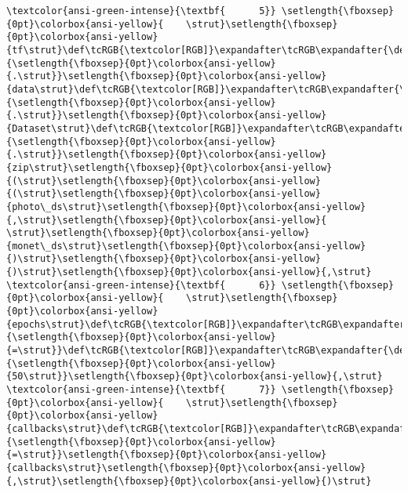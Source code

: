 \documentclass[11pt]{article}
\begin{document}
\begin{Verbatim}[commandchars=\\\{\}, frame=single, framerule=2mm, rulecolor=\color{outerrorbackground}]
\textcolor{ansi-green-intense}{\textbf{      5}} \setlength{\fboxsep}{0pt}\colorbox{ansi-yellow}{    \strut}\setlength{\fboxsep}{0pt}\colorbox{ansi-yellow}{tf\strut}\def\tcRGB{\textcolor[RGB]}\expandafter\tcRGB\expandafter{\detokenize{98,98,98}}{\setlength{\fboxsep}{0pt}\colorbox{ansi-yellow}{.\strut}}\setlength{\fboxsep}{0pt}\colorbox{ansi-yellow}{data\strut}\def\tcRGB{\textcolor[RGB]}\expandafter\tcRGB\expandafter{\detokenize{98,98,98}}{\setlength{\fboxsep}{0pt}\colorbox{ansi-yellow}{.\strut}}\setlength{\fboxsep}{0pt}\colorbox{ansi-yellow}{Dataset\strut}\def\tcRGB{\textcolor[RGB]}\expandafter\tcRGB\expandafter{\detokenize{98,98,98}}{\setlength{\fboxsep}{0pt}\colorbox{ansi-yellow}{.\strut}}\setlength{\fboxsep}{0pt}\colorbox{ansi-yellow}{zip\strut}\setlength{\fboxsep}{0pt}\colorbox{ansi-yellow}{(\strut}\setlength{\fboxsep}{0pt}\colorbox{ansi-yellow}{(\strut}\setlength{\fboxsep}{0pt}\colorbox{ansi-yellow}{photo\_ds\strut}\setlength{\fboxsep}{0pt}\colorbox{ansi-yellow}{,\strut}\setlength{\fboxsep}{0pt}\colorbox{ansi-yellow}{ \strut}\setlength{\fboxsep}{0pt}\colorbox{ansi-yellow}{monet\_ds\strut}\setlength{\fboxsep}{0pt}\colorbox{ansi-yellow}{)\strut}\setlength{\fboxsep}{0pt}\colorbox{ansi-yellow}{)\strut}\setlength{\fboxsep}{0pt}\colorbox{ansi-yellow}{,\strut}
\textcolor{ansi-green-intense}{\textbf{      6}} \setlength{\fboxsep}{0pt}\colorbox{ansi-yellow}{    \strut}\setlength{\fboxsep}{0pt}\colorbox{ansi-yellow}{epochs\strut}\def\tcRGB{\textcolor[RGB]}\expandafter\tcRGB\expandafter{\detokenize{98,98,98}}{\setlength{\fboxsep}{0pt}\colorbox{ansi-yellow}{=\strut}}\def\tcRGB{\textcolor[RGB]}\expandafter\tcRGB\expandafter{\detokenize{98,98,98}}{\setlength{\fboxsep}{0pt}\colorbox{ansi-yellow}{50\strut}}\setlength{\fboxsep}{0pt}\colorbox{ansi-yellow}{,\strut}
\textcolor{ansi-green-intense}{\textbf{      7}} \setlength{\fboxsep}{0pt}\colorbox{ansi-yellow}{    \strut}\setlength{\fboxsep}{0pt}\colorbox{ansi-yellow}{callbacks\strut}\def\tcRGB{\textcolor[RGB]}\expandafter\tcRGB\expandafter{\detokenize{98,98,98}}{\setlength{\fboxsep}{0pt}\colorbox{ansi-yellow}{=\strut}}\setlength{\fboxsep}{0pt}\colorbox{ansi-yellow}{callbacks\strut}\setlength{\fboxsep}{0pt}\colorbox{ansi-yellow}{,\strut}\setlength{\fboxsep}{0pt}\colorbox{ansi-yellow}{)\strut}


\end{Verbatim}
\end{document}
